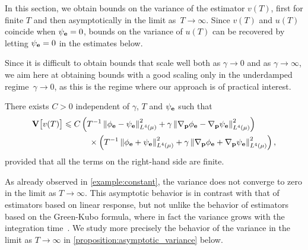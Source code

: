 \documentclass[11pt,a4paper]{article}
\begin{document}
In this section, we obtain bounds on the variance of the estimator $v(T)$,
first for finite $T$ and then asymptotically in the limit as~$T \to \infty$.
Since $v(T)$ and $u(T)$ coincide when $\psi_{\boldsymbol{\mathbf e}} = 0$,
bounds on the variance of $u(T)$ can be recovered by letting $\psi_{\boldsymbol{\mathbf e}} = 0$ in the estimates below.


Since it is difficult to obtain bounds that scale well both as $\gamma \to 0$ and as $\gamma \to \infty$,
we aim here at obtaining bounds with a good scaling only in the underdamped regime~$\gamma \to 0$,
as this is the regime where our approach is of practical interest.

\begin{proposition}
    \label{proposition:variance}
    There exists $C > 0$ independent of $\gamma$, $T$ and $\psi_{\boldsymbol{\mathbf e}}$ such that
    \begin{equation}
        \label{eq:statement_variance}
        \begin{aligned}[b]
            \var \bigl[v(T)\bigr]
            \leq
            C &\left( T^{-1} \norm{\phi_{\vect e} - \psi_{\vect e}}[L^4(\mu)]^2  + \gamma \norm{\grad_{\vect p} \phi_{\vect e} - \grad_{\vect p} \psi_{\vect e}}[L^4(\mu)]^2 \right) \\
              &\quad \times \left( T^{-1} \norm{\phi_{\vect e} + \psi_{\vect e}}[L^4(\mu)]^2  + \gamma \norm{\grad_{\vect p} \phi_{\vect e} + \grad_{\vect p} \psi_{\vect e}}[L^4(\mu)]^2 \right),
        \end{aligned}
    \end{equation}
    provided that all the terms on the right-hand side are finite.
\end{proposition}
\begin{remark}
    As already observed in \cref{example:constant},
    the variance does not converge to zero in the limit as $T \to \infty$.
    This asymptotic behavior is in contrast with that of estimators based on linear response,
    but not unlike the behavior of estimators based on the Green-Kubo formula,
    where in fact the variance grows with the integration time~\cite{LMS16}.
    We study more precisely the behavior of the variance in the limit as $T \to \infty$ in \cref{proposition:asymptotic_variance} below.
\end{remark}
\end{document}
